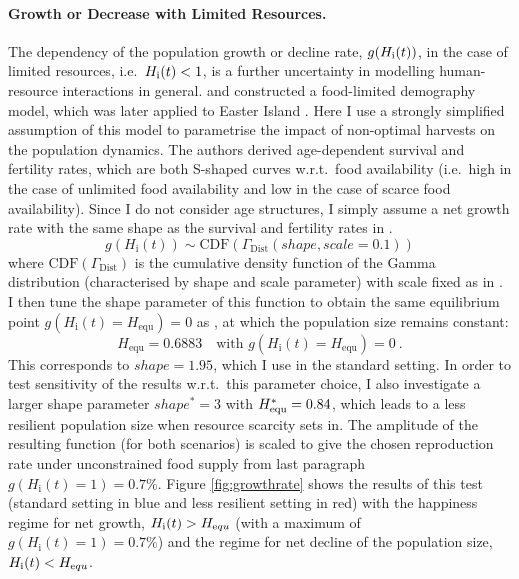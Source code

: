 \paragraph{Growth or Decrease with Limited Resources.}
The dependency of the population growth or decline rate, $g(H_{\rm i}(t))$, in the case of limited resources, i.e.\ $H_{\rm i}(t)<1$, is a further uncertainty in modelling human-resource interactions in general.
\citet{Lee2008} and \citet{Puleston2008} constructed a food-limited demography model, which was later applied to Easter Island \citep{Puleston2017}. 
Here I use a strongly simplified assumption of this model to parametrise the impact of non-optimal harvests on the population dynamics. 
The authors derived age-dependent survival and fertility rates, which are both S-shaped curves w.r.t.\ food availability (i.e.\ high in the case of unlimited food availability and low in the case of scarce food availability).
Since I do not consider age structures, I simply assume a net growth rate with the same shape as the survival and fertility rates in \citet{Lee2008}.
\begin{equation}
g(H_\text{i}(t)) \sim \text{CDF}(\Gamma_\text{Dist}(shape, scale=0.1))
\end{equation}
where $\text{CDF}(\Gamma_\text{Dist})$ is the cumulative density function of the Gamma distribution (characterised by shape and scale parameter) with scale fixed as in \citet{Lee2008}.
I then tune the shape parameter of this function to obtain the same equilibrium point $g(H_\text{i}(t) =H_\text{equ})=0$ as \citet{Puleston2017}, at which the population size remains constant:
\begin{equation}
H_\text{equ}=0.6883 \quad \text{with } g(H_\text{i}(t) = H_\text{equ})=0   \ .
\end{equation} 
This corresponds to $shape=1.95$, which I use in the standard setting.
In order to test sensitivity of the results w.r.t.\ this parameter choice, I also investigate a larger shape parameter $shape^*=3$ with $H_{\rm equ}^*=0.84$, which leads to a less resilient population size when resource scarcity sets in.
The amplitude of the resulting function (for both scenarios) is scaled to give the chosen reproduction rate under unconstrained food supply from last paragraph 
$g(H_\text{i}(t)=1)=0.7\%$.
Figure \ref{fig:growthrate} shows the results of this test (standard setting in blue and less resilient setting in red) with the happiness regime for net growth, $H_\text{i}(t) > H_{\text equ}$ (with a maximum of $g(H_\text{i}(t)=1)=0.7\%$) and the regime for net decline of the population size, $H_\text{i}(t) < H_{\text equ}$.
